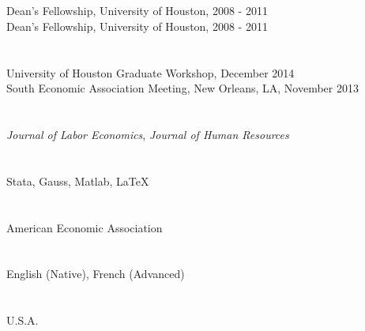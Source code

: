 \documentclass[margin, 11pt]{res} %
\begin{document}
\begin{resume}


\section{}
Dean's Fellowship, University of Houston, 2008 - 2011\\
Dean's Fellowship, University of Houston, 2008 - 2011


\section{}
University of Houston Graduate Workshop, December 2014\\
South Economic Association Meeting, New Orleans, LA, November 2013\\

\section{}
\emph{Journal of Labor Economics}, \emph{Journal of Human Resources}\\

\section{}
Stata, Gauss, Matlab, \LaTeX\\
 
\section{}
American Economic Association

\section{}
English (Native), French (Advanced)

\section{}
U.S.A.\\




\end{resume}
\end{document}
